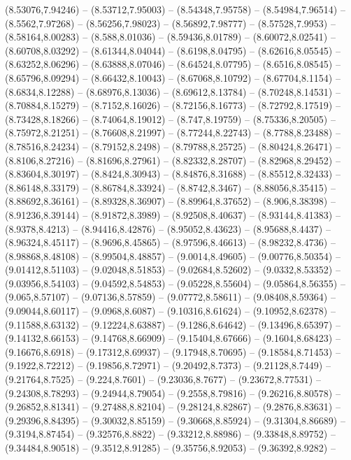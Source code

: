{(8.53076,7.94246) -- (8.53712,7.95003) -- (8.54348,7.95758) -- (8.54984,7.96514) -- (8.5562,7.97268) -- (8.56256,7.98023) -- (8.56892,7.98777) -- (8.57528,7.9953) -- (8.58164,8.00283) -- (8.588,8.01036) -- (8.59436,8.01789) -- (8.60072,8.02541) --
(8.60708,8.03292) -- (8.61344,8.04044) -- (8.6198,8.04795) -- (8.62616,8.05545) -- (8.63252,8.06296) -- (8.63888,8.07046) -- (8.64524,8.07795) -- (8.6516,8.08545) -- (8.65796,8.09294) -- (8.66432,8.10043) -- (8.67068,8.10792) -- (8.67704,8.1154) --
(8.6834,8.12288) -- (8.68976,8.13036) -- (8.69612,8.13784) -- (8.70248,8.14531) -- (8.70884,8.15279) -- (8.7152,8.16026) -- (8.72156,8.16773) -- (8.72792,8.17519) -- (8.73428,8.18266) -- (8.74064,8.19012) -- (8.747,8.19759) -- (8.75336,8.20505) --
(8.75972,8.21251) -- (8.76608,8.21997) -- (8.77244,8.22743) -- (8.7788,8.23488) -- (8.78516,8.24234) -- (8.79152,8.2498) -- (8.79788,8.25725) -- (8.80424,8.26471) -- (8.8106,8.27216) -- (8.81696,8.27961) -- (8.82332,8.28707) -- (8.82968,8.29452) --
(8.83604,8.30197) -- (8.8424,8.30943) -- (8.84876,8.31688) -- (8.85512,8.32433) -- (8.86148,8.33179) -- (8.86784,8.33924) -- (8.8742,8.3467) -- (8.88056,8.35415) -- (8.88692,8.36161) -- (8.89328,8.36907) -- (8.89964,8.37652) -- (8.906,8.38398) --
(8.91236,8.39144) -- (8.91872,8.3989) -- (8.92508,8.40637) -- (8.93144,8.41383) -- (8.9378,8.4213) -- (8.94416,8.42876) -- (8.95052,8.43623) -- (8.95688,8.4437) -- (8.96324,8.45117) -- (8.9696,8.45865) -- (8.97596,8.46613) -- (8.98232,8.4736) --
(8.98868,8.48108) -- (8.99504,8.48857) -- (9.0014,8.49605) -- (9.00776,8.50354) -- (9.01412,8.51103) -- (9.02048,8.51853) -- (9.02684,8.52602) -- (9.0332,8.53352) -- (9.03956,8.54103) -- (9.04592,8.54853) -- (9.05228,8.55604) -- (9.05864,8.56355) --
(9.065,8.57107) -- (9.07136,8.57859) -- (9.07772,8.58611) -- (9.08408,8.59364) -- (9.09044,8.60117) -- (9.0968,8.6087) -- (9.10316,8.61624) -- (9.10952,8.62378) -- (9.11588,8.63132) -- (9.12224,8.63887) -- (9.1286,8.64642) -- (9.13496,8.65397) --
(9.14132,8.66153) -- (9.14768,8.66909) -- (9.15404,8.67666) -- (9.1604,8.68423) -- (9.16676,8.6918) -- (9.17312,8.69937) -- (9.17948,8.70695) -- (9.18584,8.71453) -- (9.1922,8.72212) -- (9.19856,8.72971) -- (9.20492,8.7373) -- (9.21128,8.7449) --
(9.21764,8.7525) -- (9.224,8.7601) -- (9.23036,8.7677) -- (9.23672,8.77531) -- (9.24308,8.78293) -- (9.24944,8.79054) -- (9.2558,8.79816) -- (9.26216,8.80578) -- (9.26852,8.81341) -- (9.27488,8.82104) -- (9.28124,8.82867) -- (9.2876,8.83631) --
(9.29396,8.84395) -- (9.30032,8.85159) -- (9.30668,8.85924) -- (9.31304,8.86689) -- (9.3194,8.87454) -- (9.32576,8.8822) -- (9.33212,8.88986) -- (9.33848,8.89752) -- (9.34484,8.90518) -- (9.3512,8.91285) -- (9.35756,8.92053) -- (9.36392,8.9282) --
}
